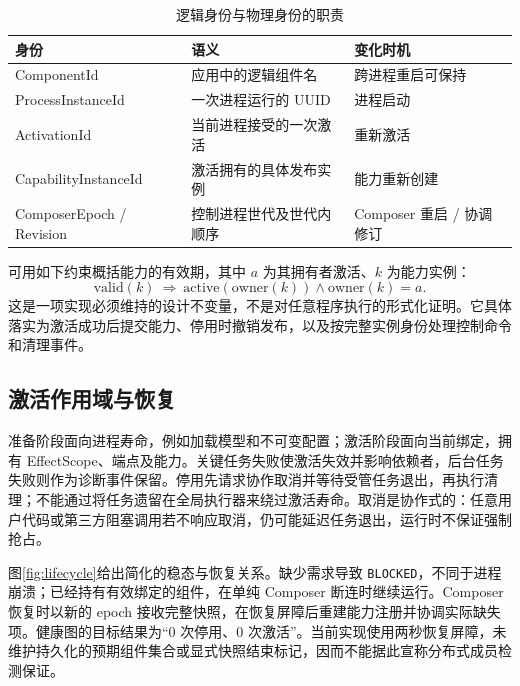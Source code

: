 \documentclass[UTF8,fontset=none,zihao=-4,a4paper]{ctexart}
\newcommand{\code}[1]{\texttt{#1}}
\begin{document}
\begin{table}[htbp]
\centering\small
\caption{逻辑身份与物理身份的职责}\label{tab:identities}
\begin{tabularx}{\textwidth}{lYY}
\toprule
身份 & 语义 & 变化时机 \\\midrule
ComponentId & 应用中的逻辑组件名 & 跨进程重启可保持 \\
ProcessInstanceId & 一次进程运行的 UUID & 进程启动 \\
ActivationId & 当前进程接受的一次激活 & 重新激活 \\
CapabilityInstanceId & 激活拥有的具体发布实例 & 能力重新创建 \\
ComposerEpoch / Revision & 控制进程世代及世代内顺序 & Composer 重启 / 协调修订 \\
\bottomrule
\end{tabularx}
\end{table}

可用如下约束概括能力的有效期，其中 $a$ 为其拥有者激活、$k$ 为能力实例：
\begin{equation}
  \mathrm{valid}(k)\ \Longrightarrow\ \mathrm{active}(\mathrm{owner}(k))\land \mathrm{owner}(k)=a.
\end{equation}
这是一项实现必须维持的设计不变量，不是对任意程序执行的形式化证明。它具体落实为激活成功后提交能力、停用时撤销发布，以及按完整实例身份处理控制命令和清理事件。

\subsection{激活作用域与恢复}
准备阶段面向进程寿命，例如加载模型和不可变配置；激活阶段面向当前绑定，拥有 EffectScope、端点及能力。关键任务失败使激活失效并影响依赖者，后台任务失败则作为诊断事件保留。停用先请求协作取消并等待受管任务退出，再执行清理；不能通过将任务遗留在全局执行器来绕过激活寿命。取消是协作式的：任意用户代码或第三方阻塞调用若不响应取消，仍可能延迟任务退出，运行时不保证强制抢占。

图\ref{fig:lifecycle}给出简化的稳态与恢复关系。缺少需求导致 \code{BLOCKED}，不同于进程崩溃；已经持有有效绑定的组件，在单纯 Composer 断连时继续运行。Composer 恢复时以新的 epoch 接收完整快照，在恢复屏障后重建能力注册并协调实际缺失项。健康图的目标结果为“0 次停用、0 次激活”。当前实现使用两秒恢复屏障，未维护持久化的预期组件集合或显式快照结束标记，因而不能据此宣称分布式成员检测保证。
\end{document}
